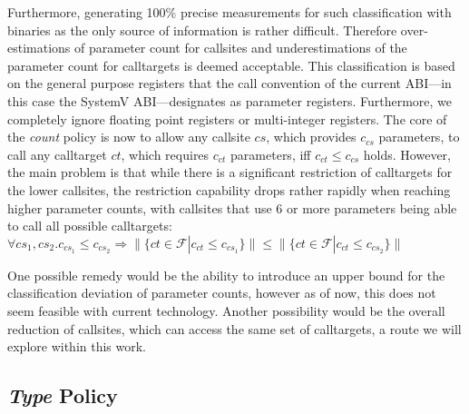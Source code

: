  Furthermore, generating 100\% precise measurements for such classification with binaries as the only source of information is rather difficult. 
 Therefore over-estimations of parameter count for callsites and underestimations of the parameter count for calltargets is deemed acceptable. 
 This classification is based on the general purpose registers that the call convention of the current ABI---in this case the 
 SystemV ABI---designates as parameter registers. Furthermore, we completely ignore floating point registers or multi-integer registers. 
 The core of the \emph{count} policy is now to allow any callsite $cs$, which provides $c_{cs}$ parameters, to call any calltarget $ct$, 
 which requires $c_{ct}$ parameters, iff $c_{ct} \leq c_{cs}$ holds. However, the main problem is that while there is a significant 
 restriction of calltargets for the lower callsites, the restriction capability drops rather rapidly when reaching higher parameter 
 counts, with callsites that use 6 or more parameters being able to call all possible calltargets:
$
	\forall cs_1, cs_2.  c_{cs_1} \leq c_{cs_2} \Longrightarrow  \| \{ct \in \mathcal{F} | c_{ct} \leq c_{cs_1} \} \| \leq \| \{ct \in \mathcal{F} | c_{ct} \leq c_{cs_2}  \} \|
$

One possible remedy would be the ability to introduce an upper bound for the classification deviation of parameter counts, 
however as of now, this does not seem feasible with current technology. Another possibility would be the overall reduction
of callsites, which can access the same set of calltargets, a route we will explore within this work.

\subsection{\emph{Type} Policy}
\label{section:typepolicy}

